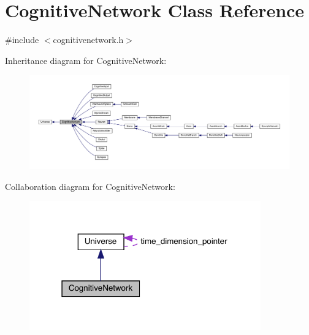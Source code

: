\hypertarget{class_cognitive_network}{}\section{Cognitive\+Network Class Reference}
\label{class_cognitive_network}


{\ttfamily \#include $<$cognitivenetwork.\+h$>$}



Inheritance diagram for Cognitive\+Network\+:\nopagebreak
\begin{figure}[H]
\begin{center}
\leavevmode
\includegraphics[width=350pt]{class_cognitive_network__inherit__graph}
\end{center}
\end{figure}


Collaboration diagram for Cognitive\+Network\+:\nopagebreak
\begin{figure}[H]
\begin{center}
\leavevmode
\includegraphics[width=283pt]{class_cognitive_network__coll__graph}
\end{center}
\end{figure}
